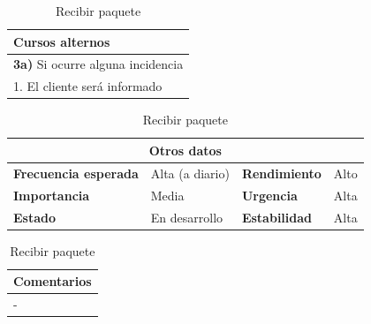 \documentclass[12pt,spanish]{article}
\begin{document}
\begin{table}[H]
\vspace{1cm}

\begin{tabular}{|m{10pt}|m{7.15cm}|m{10pt}|m{7.15cm}|}
\hline
\multicolumn{4}{|m{16.2cm}|}{\textbf{Cursos alternos}} \\
\hline
\multicolumn{4}{|m{16.2cm}|}{\textbf{3a)} Si ocurre alguna incidencia} \\
\hline
\multicolumn{4}{|m{16.2cm}|}{1. El cliente será informado}\\
\hline
\end{tabular}

\vspace{1cm}

\begin{tabular}{|m{3.72cm}|m{3.72cm}|m{3.72cm}|m{3.72cm}|}
\hline
\multicolumn{4}{|c|}{\textbf{Otros datos}} \\
\hline
\textbf{Frecuencia esperada} & Alta (a diario) & \textbf{Rendimiento} & Alto \\
\hline
\textbf{Importancia} & Media & \textbf{Urgencia} & Alta \\
\hline
\textbf{Estado} & En desarrollo & \textbf{Estabilidad} & Alta \\
\hline
\end{tabular}

\vspace{1cm}

\begin{tabular}{|m{16.2cm}|}
\hline
\textbf{Comentarios} \\
\hline
- \\
\hline
\end{tabular}

\caption{Recibir paquete}

\end{table}


\end{document}
